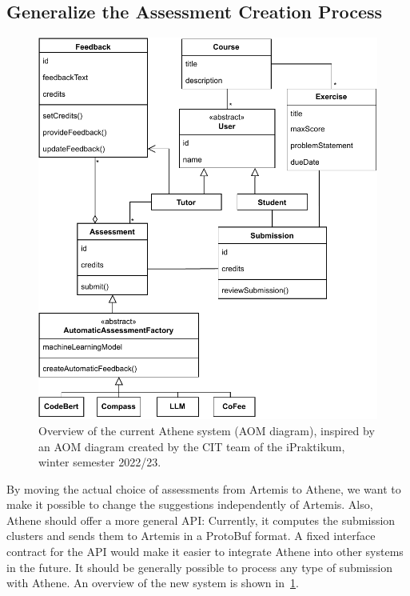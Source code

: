 
\subsection{Generalize the Assessment Creation Process}
\begin{figure}[ht]
    \centering
    \includegraphics[width=0.9\linewidth]{figures/proposal/aom.pdf}
    \caption{Overview of the current Athene system (AOM diagram), inspired by an AOM diagram created by the CIT team of the iPraktikum, winter semester 2022/23.}
    \label{fig:aom}
\end{figure}
By moving the actual choice of assessments from Artemis to Athene, we want to make it possible to change the suggestions independently of Artemis. Also, Athene should offer a more general API: Currently, it computes the submission clusters and sends them to Artemis in a ProtoBuf format. A fixed interface contract for the API would make it easier to integrate Athene into other systems in the future. It should be generally possible to process any type of submission with Athene. An overview of the new system is shown in~\cref{fig:aom}.

